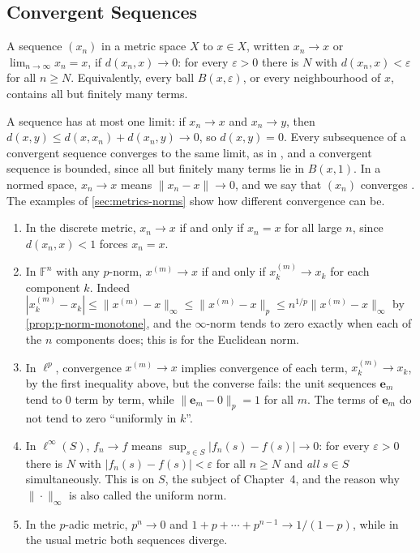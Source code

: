 \subsection{Convergent Sequences}

\begin{definition}
\label{def:metric-convergence}
A sequence $(x_n)$ in a metric space $X$  to $x\in X$, written $x_n\to x$ or $\lim_{n\to\infty}x_n=x$, if $d(x_n,x)\to0$: for every $\varepsilon>0$ there is $N$ with $d(x_n,x)<\varepsilon$ for all $n\ge N$. Equivalently, every ball $B(x,\varepsilon)$, or every neighbourhood of $x$, contains all but finitely many terms.
\end{definition}

A sequence has at most one limit: if $x_n\to x$ and $x_n\to y$, then $d(x,y)\le d(x,x_n)+d(x_n,y)\to0$, so $d(x,y)=0$. Every subsequence of a convergent sequence converges to the same limit, as in , and a convergent sequence is bounded, since all but finitely many terms lie in $B(x,1)$. In a normed space, $x_n\to x$ means $\|x_n-x\|\to0$, and we say that $(x_n)$ converges . The examples of \cref{sec:metrics-norms} show how different convergence can be.

\begin{enumerate}
\item In the discrete metric, $x_n\to x$ if and only if $x_n=x$ for all large $n$, since $d(x_n,x)<1$ forces $x_n=x$.
\item In $\mathbb F^n$ with any $p$-norm, $x^{(m)}\to x$ if and only if $x^{(m)}_k\to x_k$ for each component $k$. Indeed $|x^{(m)}_k-x_k|\le\|x^{(m)}-x\|_\infty\le\|x^{(m)}-x\|_p\le n^{1/p}\|x^{(m)}-x\|_\infty$ by \cref{prop:p-norm-monotone}, and the $\infty$-norm tends to zero exactly when each of the $n$ components does; this is  for the Euclidean norm.
\item In $\ell^p$, convergence $x^{(m)}\to x$ implies convergence of each term, $x^{(m)}_k\to x_k$, by the first inequality above, but the converse fails: the unit sequences $\mathbf e_m$ tend to $0$ term by term, while $\|\mathbf e_m-0\|_p=1$ for all $m$. The terms of $\mathbf e_m$ do not tend to zero ``uniformly in $k$''.
\item In $\ell^\infty(S)$, $f_n\to f$ means $\sup_{s\in S}|f_n(s)-f(s)|\to0$: for every $\varepsilon>0$ there is $N$ with $|f_n(s)-f(s)|<\varepsilon$ for all $n\ge N$ and \emph{all} $s\in S$ simultaneously. This is  on $S$, the subject of Chapter~4, and the reason why $\|\cdot\|_\infty$ is also called the uniform norm.
\item In the $p$-adic metric, $p^n\to0$ and $1+p+\cdots+p^{n-1}\to1/(1-p)$, while in the usual metric both sequences diverge.
\end{enumerate}

